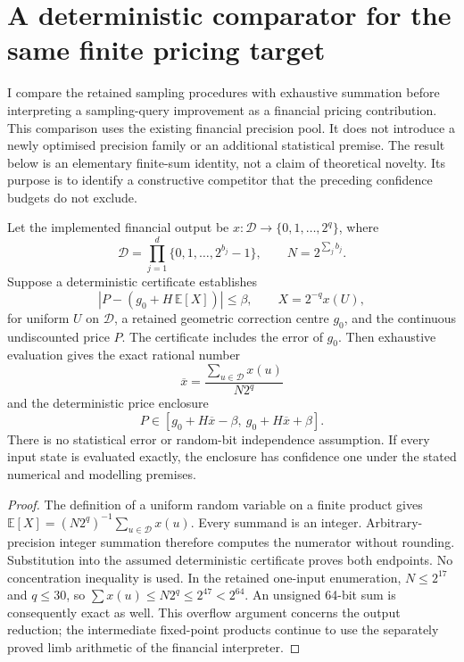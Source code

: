 \section{A deterministic comparator for the same finite pricing target}

I compare the retained sampling procedures with exhaustive summation before
interpreting a sampling-query improvement as a financial pricing contribution.
This comparison uses the existing financial precision pool. It does not introduce
a newly optimised precision family or an additional statistical premise.
The result below is an elementary finite-sum identity, not a claim of theoretical
novelty. Its purpose is to identify a constructive competitor that the preceding
confidence budgets do not exclude.

\begin{proposition}
Let the implemented financial output be
\(x:\mathcal D\longrightarrow\{0,1,\ldots,2^q\}\), where
\[
 \mathcal D=\prod_{j=1}^{d}\{0,1,\ldots,2^{b_j}-1\},
 \qquad N=2^{\sum_j b_j}.
\]
Suppose a deterministic certificate establishes
\[
 \left|P-\left(g_0+H\,\mathbb E[X]\right)\right|\leq\beta,
 \qquad X=2^{-q}x(U),
\]
for uniform \(U\) on \(\mathcal D\), a retained geometric correction centre
\(g_0\), and the continuous undiscounted price \(P\). The certificate includes
the error of \(g_0\). Then exhaustive evaluation gives the exact rational number
\[
 \overline x=\frac{\sum_{u\in\mathcal D}x(u)}{N2^q}
\]
and the deterministic price enclosure
\[
 P\in[g_0+H\overline x-\beta,\ g_0+H\overline x+\beta].
\]
There is no statistical error or random-bit independence assumption. If every
input state is evaluated exactly, the enclosure has confidence one under the
stated numerical and modelling premises.
\end{proposition}

\begin{proof}
The definition of a uniform random variable on a finite product gives
\(\mathbb E[X]=(N2^q)^{-1}\sum_{u\in\mathcal D}x(u)\). Every summand is an
integer. Arbitrary-precision integer summation therefore computes the numerator
without rounding. Substitution into the assumed deterministic certificate proves
both endpoints. No concentration inequality is used. In the retained one-input
enumeration, \(N\leq2^{17}\) and \(q\leq30\), so
\(\sum x(u)\leq N2^q\leq2^{47}<2^{64}\). An unsigned 64-bit sum is consequently
exact as well. This overflow argument concerns the output reduction; the
intermediate fixed-point products continue to use the separately proved limb
arithmetic of the financial interpreter.
\end{proof}

